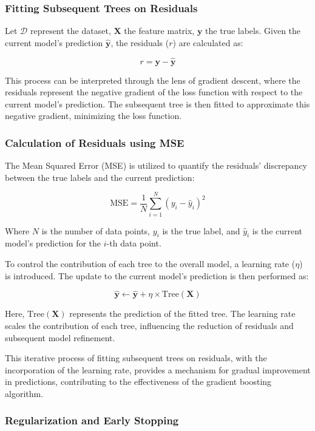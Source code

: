 \subsubsection{Fitting Subsequent Trees on Residuals}

Let \( \mathcal{D} \) represent the dataset, \( \mathbf{X} \) the feature matrix, \( \mathbf{y} \) the true labels. 
Given the current model's prediction \( \hat{\mathbf{y}} \), the residuals (\( r \)) are calculated as:

\[ r = \mathbf{y} - \hat{\mathbf{y}} \]

This process can be interpreted through the lens of gradient descent, where the residuals represent the negative gradient of the loss function with respect to the current model's prediction. The subsequent tree is then fitted to approximate this negative gradient, minimizing the loss function.

\subsubsection{Calculation of Residuals using MSE}

The Mean Squared Error (MSE) is utilized to quantify the residuals' discrepancy between the true labels and the current prediction:

\[ \text{MSE} = \frac{1}{N} \sum_{i=1}^{N} (y_i - \hat{y}_i)^2 \]

Where \( N \) is the number of data points, \( y_i \) is the true label, and \( \hat{y}_i \) is the current model's prediction for the \( i \)-th data point.

To control the contribution of each tree to the overall model, a learning rate (\(\eta\)) is introduced. The update to the current model's prediction is then performed as:

\[ \hat{\mathbf{y}} \leftarrow \hat{\mathbf{y}} + \eta \times \text{{Tree}}(\mathbf{X}) \]

Here, \(\text{{Tree}}(\mathbf{X})\) represents the prediction of the fitted tree. The learning rate scales the contribution of each tree, influencing the reduction of residuals and subsequent model refinement.

This iterative process of fitting subsequent trees on residuals, with the incorporation of the learning rate, provides a mechanism for gradual improvement in predictions, contributing to the effectiveness of the gradient boosting algorithm.

\subsubsection{Regularization and Early Stopping}

